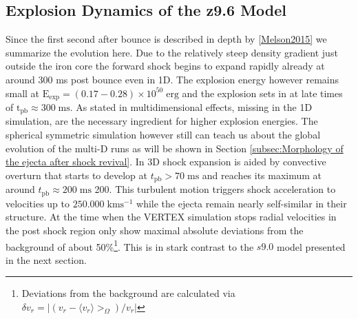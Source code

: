 \documentclass[fleqn,usenatbib]{mnras}
\newcommand{\vertex}{\textsc{V{\footnotesize ERTEX}}\xspace}
\begin{document}
\subsection{Explosion Dynamics of the z9.6 Model}
Since the first second after bounce is described in depth by \ref{Melson2015} we summarize the evolution here. 
Due to the relatively steep density gradient just outside the iron core the forward shock begins to expand rapidly already at around 300 ms post bounce even in 1D. The explosion energy however remains small at $\mathrm{E_{exp}}=(0.17-0.28)\times 10^{50} \; \mathrm{erg}$ and the explosion sets in at late times of $\mathrm{t_{pb}}\approx 300\;\mathrm{ms}$. As stated in \cite{Melson2015} multidimensional effects, missing in the 1D simulation, are the necessary ingredient for higher explosion energies. The spherical symmetric simulation however still can teach us about the global evolution of the multi-D runs as will be shown in Section \ref{subsec:Morphology of the ejecta after shock revival}.
In 3D shock expansion is aided by convective overturn that starts to develop at $t_{\mathrm{pb}} > 70\;\mathrm{ms} $ and reaches its maximum at around $t_{\mathrm{pb}} \approx 200\;\mathrm{ms}$ 200. This turbulent motion triggers shock acceleration to velocities up to $\mathrm{250.000\;km s^{-1}}$ while the ejecta remain nearly self-similar in their structure. 
At the time when the \vertex simulation stops radial velocities in the post shock region only show maximal absolute deviations from the background of about 50\%\footnote{Deviations from the background are calculated via $\delta v_r = | (v_r - \langle v_r \rangle>_{\Omega}) / v_r |$}. This is in stark contrast to the $s9.0$ model presented in the next section. 
\end{document}
